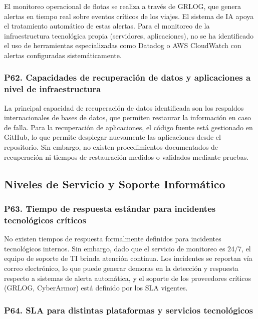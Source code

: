 \documentclass[12pt]{article}
\begin{document}
El monitoreo operacional de flotas se realiza a trav\'es de GRLOG, que genera
alertas en tiempo real sobre eventos cr\'iticos de los viajes. El sistema de IA apoya el tratamiento autom\'atico de estas alertas. Para el monitoreo
de la infraestructura tecnol\'ogica propia (servidores, aplicaciones), no se ha
identificado el uso de herramientas especializadas como Datadog o AWS CloudWatch con
alertas configuradas sistem\'aticamente.

\subsubsection*{\textbf{P62. Capacidades de recuperaci\'on de datos y aplicaciones a nivel de infraestructura}}

La principal capacidad de recuperaci\'on de datos identificada son los respaldos
internacionales de bases de datos, que permiten restaurar la informaci\'on en caso de
falla. Para la recuperaci\'on de aplicaciones, el c\'odigo fuente est\'a gestionado en
GitHub, lo que permite desplegar nuevamente las aplicaciones desde el repositorio.
Sin embargo, no existen procedimientos documentados de recuperaci\'on ni tiempos de
restauraci\'on medidos o validados mediante pruebas.

\subsection{Niveles de Servicio y Soporte Inform\'atico}

\subsubsection*{\textbf{P63. Tiempo de respuesta est\'andar para incidentes tecnol\'ogicos cr\'iticos}}

No existen tiempos de respuesta formalmente definidos para incidentes tecnol\'ogicos internos.
Sin embargo, dado que el servicio de monitoreo es 24/7, el equipo de soporte de TI brinda
atenci\'on continua. Los incidentes se reportan v\'ia correo electr\'onico, lo que puede
generar demoras en la detecci\'on y respuesta respecto a sistemas de alerta autom\'atica, y el soporte de los proveedores cr\'iticos (GRLOG, CyberArmor) est\'a definido por los SLA
vigentes.

\subsubsection*{\textbf{P64. SLA para distintas plataformas y servicios tecnol\'ogicos}}
\end{document}
